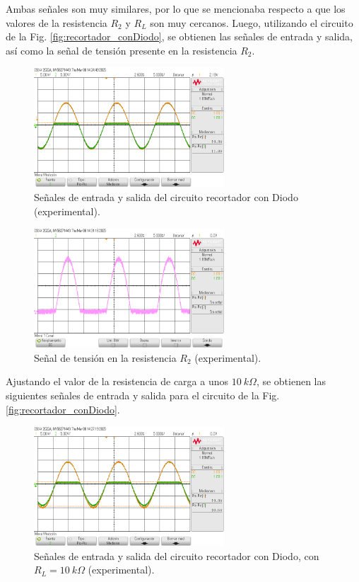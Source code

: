 \documentclass[journal]{IEEEtran}
\begin{document}
Ambas señales son muy similares, por lo que se mencionaba respecto a que los valores de la resistencia $R_2$ y $R_L$ son muy cercanos. Luego,
utilizando el circuito de la Fig. \ref{fig:recortador_conDiodo}, se obtienen las señales de entrada y salida, así como la señal de tensión presente en la resistencia $R_2$.

\begin{figure}[H]
        \centering
        \includegraphics[width=2.8in]{SignalExperimental_03.png}
        \caption{Señales de entrada y salida del circuito recortador con Diodo (experimental).}
        \label{fig:SignalExperimental_03}
\end{figure}

\begin{figure}[H]
        \centering
        \includegraphics[width=2.8in]{SignalExperimental_04.png}
        \caption{Señal de tensión en la resistencia $R_2$ (experimental).}
        \label{fig:SignalExperimental_04}
\end{figure}

Ajustando el valor de la resistencia de carga a unos $10~k\Omega$, se obtienen las siguientes señales de entrada y salida para el circuito de la Fig. \ref{fig:recortador_conDiodo}.
\begin{figure}[H]
        \centering
        \includegraphics[width=2.8in]{SignalExperimental_05.png}
        \caption{Señales de entrada y salida del circuito recortador con Diodo, con $R_L=10~k\Omega$ (experimental).}
        \label{fig:SignalExperimental_05}
\end{figure}
\end{document}
